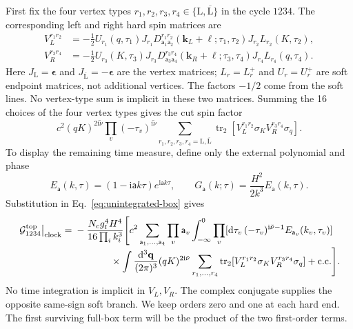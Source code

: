 \documentclass[a4paper,12pt]{article}
\newcommand{\ii}{\mathrm i}
\newcommand{\mb}{\mathbf}
\newcommand{\tn}{\tilde\nu}
\def\aa{\mathsf a}
\newcommand{\di}{\mathrm d}
\newcommand{\tr}{\operatorname{tr}}
\newcommand{\bq}{\mb q}
\newcommand{\G}{\mathcal G}
\newcommand{\epsmat}{\boldsymbol{\epsilon}}
\begin{document}
First fix the four vertex types
$r_1,r_2,r_3,r_4\in\{\mathrm L,\overline{\mathrm L}\}$ in the cycle $1234$.
The corresponding left and right hard spin matrices are
\begin{align}
 V_L^{r_1r_2}&=-\frac12
 U_{r_1}(q,\tau_1)J_{r_1}D^{r_1r_2}_{\aa_1\aa_2}
 (\mb k_L+\bm\ell;\tau_1,\tau_2)J_{r_2}L_{r_2}(K,\tau_2),\nonumber\\
 V_R^{r_3r_4}&=-\frac12
 U_{r_3}(K,\tau_3)J_{r_3}D^{r_3r_4}_{\aa_3\aa_4}
 (\mb k_R+\bm\ell;\tau_3,\tau_4)J_{r_4}L_{r_4}(q,\tau_4).
 \label{eq:weyl-hard-block}
\end{align}
Here $J_{\mathrm L}=\epsmat$ and $J_{\overline{\mathrm L}}=-\epsmat$
are the vertex matrices; $L_r=L_r^+$ and $U_r=U_r^+$ are soft endpoint
matrices, not additional vertices. The factors $-1/2$ come from the
soft lines. No vertex-type sum is implicit in these two matrices.
Summing the 16 choices of the four vertex types gives the cut spin factor
\begin{equation}
 c^2(qK)^{2\ii\tn}\prod_v(-\tau_v)^{\ii\tn}
 \sum_{r_1,r_2,r_3,r_4=\mathrm L,\overline{\mathrm L}}
 \tr_2[V_L^{r_1r_2}\sigma_K V_R^{r_3r_4}\sigma_q].
 \label{eq:spin-cut}
\end{equation}
To display the remaining time measure, define only the external
polynomial and phase
\[
 E_{\aa}(k,\tau)=(1-\ii \aa k\tau)e^{\ii \aa k\tau},
 \qquad G_{\aa}(k;\tau)=\frac{H^2}{2k^3}E_{\aa}(k,\tau).
\]
Substitution in Eq.~\eqref{eq:unintegrated-box} gives
\begin{align}
 \left.\G^{\rm top}_{1234}\right|_{\rm clock}
 ={}&-\frac{N_cg_t^4H^4}{16\prod_i k_i^3}
 \Bigg[c^2\sum_{\aa_1,\ldots,\aa_4}\prod_v \aa_v
 \int_{-\infty}^0\prod_v
 [\di\tau_v\,(-\tau_v)^{\ii\tn-1}E_{\aa_v}(k_v,\tau_v)]
 \nonumber\\[-1mm]
 &\hspace{13mm}\times
 \int\frac{\di^3\bq}{(2\pi)^3}(qK)^{2\ii\tn}
 \sum_{r_1,\ldots,r_4}
 \tr_2[V_L^{r_1r_2}\sigma_K V_R^{r_3r_4}\sigma_q]
 +\mathrm{c.c.}\Bigg].
 \label{eq:factorized-clock}
\end{align}
No time integration is implicit in $V_L,V_R$.
The complex conjugate supplies the opposite same-sign soft branch.
We keep orders zero and one at each hard end. The first surviving
full-box term will be the product of the two first-order terms.
\end{document}

